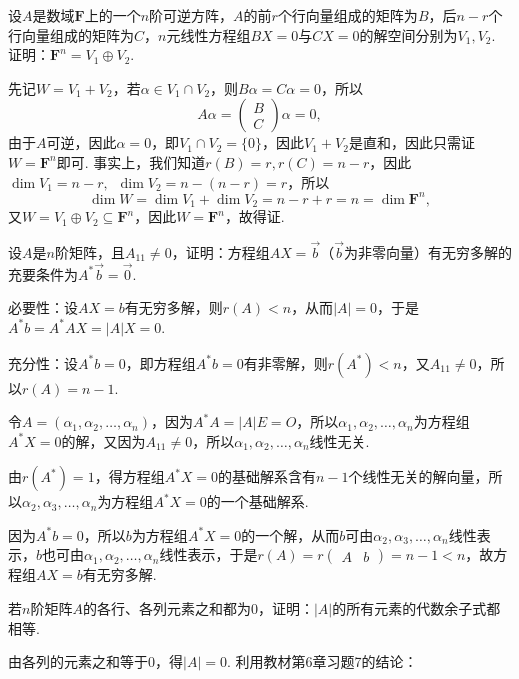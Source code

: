 \begin{exercise}
\begin{exgroup}
        \item 设$A$是数域$\mathbf{F}$上的一个$n$阶可逆方阵，$A$的前$r$个行向量组成的矩阵为$B$，后$n-r$个行向量组成的矩阵为$C$，$n$元线性方程组$BX=0$与$CX=0$的解空间分别为$V_1,V_2$. 证明：$\mathbf{F}^n=V_1\oplus V_2$.
        \begin{answer}
            先记$W=V_1+V_2$，若$\alpha\in V_1\cap V_2$，则$B\alpha=C\alpha=0$，所以
            \[A\alpha=\begin{pmatrix}
                    B \\
                    C
                \end{pmatrix}\alpha=0,\]
            由于$A$可逆，因此$\alpha=0$，即$V_1\cap V_2=\{0\}$，因此$V_1+V_2$是直和，因此只需证$W=\mathbf{F}^n$即可. 事实上，我们知道$r(B)=r,r(C)=n-r$，因此$\dim V_1=n-r,\enspace \dim V_2=n-(n-r)=r$，所以
            \[\dim W=\dim V_1+\dim V_2=n-r+r=n=\dim \mathbf{F}^n,\]
            又$W=V_1\oplus V_2\subseteq \mathbf{F}^n$，因此$W=\mathbf{F}^n$，故得证.
        \end{answer}

        \item 设$A$是$n$阶矩阵，且$A_{11}\neq 0$，证明：方程组$AX=\vec{b}$（$\vec{b}$为非零向量）有无穷多解的充要条件为$A^*\vec{b}=\vec{0}$.
        \begin{answer}
            必要性：设$AX=b$有无穷多解，则$r(A)<n$，从而$|A|=0$，于是$A^*b=A^*AX=|A|X=0$.

          充分性：设$A^*b=0$，即方程组$A^*b=0$有非零解，则$r(A^*)<n$，又$A_{11}\neq 0$，所以$r(A)=n-1$.

          令$A=(\alpha_1,\alpha_2,\ldots,\alpha_n)$，因为$A^*A=|A|E=O$，所以$\alpha_1,\alpha_2,\ldots,\alpha_n$为方程组$A^*X=0$的解，又因为$A_{11}\neq 0$，所以$\alpha_1,\alpha_2,\ldots,\alpha_n$线性无关.

          由$r(A^*)=1$，得方程组$A^*X=0$的基础解系含有$n-1$个线性无关的解向量，所以$\alpha_2,\alpha_3,\ldots,\alpha_n$为方程组$A^*X=0$的一个基础解系.

          因为$A^*b=0$，所以$b$为方程组$A^*X=0$的一个解，从而$b$可由$\alpha_2,\alpha_3,\ldots,\alpha_n$线性表示，$b$也可由$\alpha_1,\alpha_2,\ldots,\alpha_n$线性表示，于是$r(A) = r\begin{pmatrix}A & b\end{pmatrix}=n-1<n$，故方程组$AX=b$有无穷多解.
        \end{answer}

        \item 若$n$阶矩阵$A$的各行、各列元素之和都为0，证明：$|A|$的所有元素的代数余子式都相等.
        \begin{answer}
            由各列的元素之和等于0，得$|A|=0$. 利用教材第6章习题7的结论：


\end{answer}
\end{exgroup}
\end{exercise}

